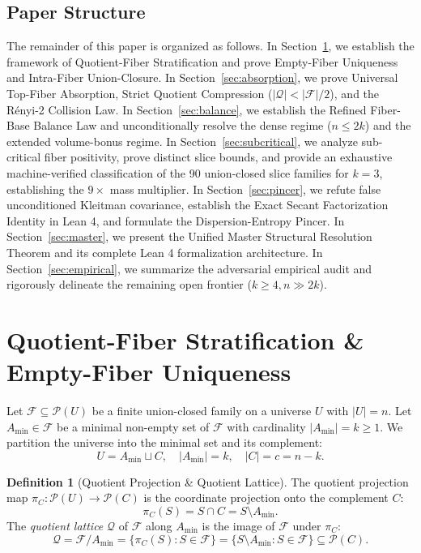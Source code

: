 \documentclass[11pt,a4paper]{article}
\theoremstyle{plain}
\theoremstyle{definition}
\newtheorem{definition}[theorem]{Definition}
\theoremstyle{remark}
\newcommand{\F}{\mathcal{F}}
\newcommand{\Q}{\mathcal{Q}}
\begin{document}
\subsection{Paper Structure}

The remainder of this paper is organized as follows. In Section~\ref{sec:quotient_strat}, we establish the framework of Quotient-Fiber Stratification and prove Empty-Fiber Uniqueness and Intra-Fiber Union-Closure. In Section~\ref{sec:absorption}, we prove Universal Top-Fiber Absorption, Strict Quotient Compression ($|\Q| < |\F|/2$), and the Rényi-2 Collision Law. In Section~\ref{sec:balance}, we establish the Refined Fiber-Base Balance Law and unconditionally resolve the dense regime ($n \le 2k$) and the extended volume-bonus regime. In Section~\ref{sec:subcritical}, we analyze sub-critical fiber positivity, prove distinct slice bounds, and provide an exhaustive machine-verified classification of the 90 union-closed slice families for $k=3$, establishing the $9\times$ mass multiplier. In Section~\ref{sec:pincer}, we refute false unconditioned Kleitman covariance, establish the Exact Secant Factorization Identity in Lean 4, and formulate the Dispersion-Entropy Pincer. In Section~\ref{sec:master}, we present the Unified Master Structural Resolution Theorem and its complete Lean 4 formalization architecture. In Section~\ref{sec:empirical}, we summarize the adversarial empirical audit and rigorously delineate the remaining open frontier ($k \ge 4, n \gg 2k$).

\section{Quotient-Fiber Stratification \& Empty-Fiber Uniqueness}\label{sec:quotient_strat}

Let $\F \subseteq \mathcal{P}(U)$ be a finite union-closed family on a universe $U$ with $|U| = n$. Let $A_{\min} \in \F$ be a minimal non-empty set of $\F$ with cardinality $|A_{\min}| = k \ge 1$. We partition the universe into the minimal set and its complement:
\begin{equation}
U = A_{\min} \sqcup C, \quad |A_{\min}| = k, \quad |C| = c = n - k.
\end{equation}

\begin{definition}[Quotient Projection \& Quotient Lattice]
The quotient projection map $\pi_C : \mathcal{P}(U) \to \mathcal{P}(C)$ is the coordinate projection onto the complement $C$:
\begin{equation}
\pi_C(S) = S \cap C = S \setminus A_{\min}.
\end{equation}
The \emph{quotient lattice} $\Q$ of $\F$ along $A_{\min}$ is the image of $\F$ under $\pi_C$:
\begin{equation}
\Q = \F / A_{\min} = \{\pi_C(S) : S \in \F\} = \{S \setminus A_{\min} : S \in \F\} \subseteq \mathcal{P}(C).
\end{equation}
\end{definition}
\end{document}

